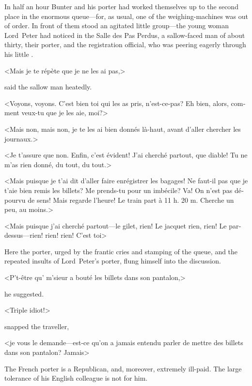 In half an hour Bunter and his porter had worked themselves up to the second place in the enormous queue—for, as usual, one of the weighing-machines was out of order. In front of them stood an agitated little group—the young woman Lord~Peter had noticed in the Salle des Pas Perdus, a sallow-faced man of about thirty, their porter, and the registration official, who was peering eagerly through his little .

\begin{french}<Mais je te répète que je ne les ai pas,> \end{french} said the sallow man heatedly. \begin{french}<Voyons, voyons. C'est bien toi qui les as pris, n'est-ce-pas? Eh bien, alors, comment veux-tu que je les aie, moi?>

<Mais non, mais non, je te les ai bien donnés là-haut, avant d'aller chercher les journaux.>

<Je t'assure que non. Enfin, c'est évident! J'ai cherché partout, que diable! Tu ne m'as rien donné, du tout, du tout.>

<Mais puisque je t'ai dit d'aller faire enrégistrer les bagages! Ne faut-il pas que je t'aie bien remis les billets? Me prends-tu pour un imbécile? Va! On n'est pas dépourvu de sens! Mais regarde l'heure! Le train part à 11 h. 20 m. Cherche un peu, au moins.>

<Mais puisque j'ai cherché partout—le gilet, rien! Le jacquet rien, rien! Le pardessus—rien! rien! rien! C'est toi\longdash>
\end{french}

Here the porter, urged by the frantic cries and stamping of the queue, and the repeated insults of Lord~Peter's porter, flung himself into the discussion.
\begin{french}<P't-être qu' m'sieur a bouté les billets dans son pantalon,>\end{french} he suggested.

\begin{french}<Triple idiot!>\end{french} snapped the traveller, \begin{french}<je vous le demande—est-ce qu'on a jamais entendu parler de mettre des billets dans son pantalon? Jamais\longdash>\end{french}

The French porter is a Republican, and, moreover, extremely ill-paid. The large tolerance of his English colleague is not for him.

